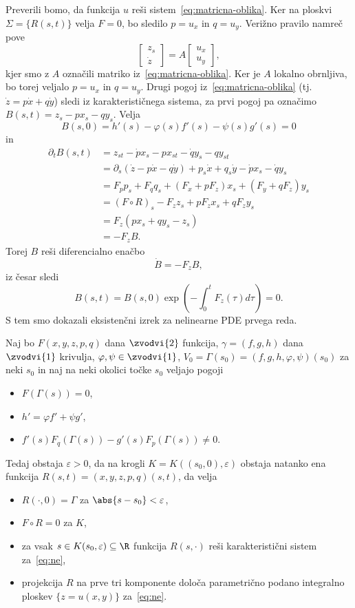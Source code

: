 Preverili bomo, da funkcija $u$ reši sistem~\eqref{eq:matricna-oblika}.
Ker na ploskvi $\Sigma = \{R(s,t)\}$ velja $F = 0$, bo sledilo $p=u_x$ in
$q=u_y$.
Verižno pravilo namreč pove
\[
  \begin{bmatrix}
	z_s \\ \dot{z}
  \end{bmatrix}
  = A
  \begin{bmatrix}
	u_x \\ u_y
  \end{bmatrix},
\]
kjer smo z $A$ označili matriko iz~\eqref{eq:matricna-oblika}.
Ker je $A$ lokalno obrnljiva, bo torej veljalo $p = u_x$ in $q = u_y$.
Drugi pogoj iz~\eqref{eq:matricna-oblika} (tj.~$\dot{z} = p \dot{x} + q
\dot{y}$) sledi iz karakterističnega sistema, za prvi pogoj pa označimo $B(s,t)
= z_s - p x_s - q y_s$.
Velja
\[
  B(s,0) = h'(s) - \varphi(s) f'(s) - \psi(s) g'(s) = 0
\]
in
\begin{align*}
  \partial_t B(s,t)
  &= z_{st} - \dot{p} x_s - p x_{st} - \dot{q} y_s - q y_{st} \\
  &= \partial_s \left( \dot{z} - p \dot{x} - q \dot{y} \right)
	+ p_s \dot{x} + q_s \dot{y} - \dot{p} x_s - \dot{q} y_s \\
  &= F_p p_s + F_q q_s + (F_x + p F_z) x_s + (F_y + q F_z) y_s \\
  &= (F \circ R)_s - F_z z_s + p F_z x_s + q F_z y_s \\
  &= F_z(p x_s + q y_s - z_s) \\
  &= - F_z B.
\end{align*}
Torej $B$ reši diferencialno enačbo
\[
  \dot{B} = - F_z B,
\]
iz česar sledi
\[
  B(s,t) = B(s,0) \exp\left( - \int_0^t F_z(\tau) d\tau \right) = 0.
\]
S tem smo dokazali eksistenčni izrek za nelinearne PDE prvega reda.

\begin{izrek}
  Naj bo $F(x,y,z,p,q)$ dana $\zvodvi{2}$ funkcija, $\gamma = (f,g,h)$ dana
  $\zvodvi{1}$ krivulja, $\varphi, \psi \in \zvodvi{1}$, $V_0 = \Gamma(s_0) =
  (f,g,h,\varphi,\psi)(s_0)$ za neki $s_0$ in naj na neki okolici točke $s_0$
  veljajo pogoji
  \begin{itemize}
  \item $F(\Gamma(s)) = 0$,
  \item $h' = \varphi f' + \psi g'$,
  \item $f'(s) F_q(\Gamma(s)) - g'(s) F_p(\Gamma(s)) \ne 0$.
  \end{itemize}
  Tedaj obstaja $\varepsilon > 0$, da na krogli $K = K((s_0, 0), \varepsilon)$
  obstaja natanko ena funkcija $R(s,t) = (x,y,z,p,q)(s,t)$, da velja
  \begin{itemize}
  \item $R(\cdot, 0) = \Gamma$ za $\abs{s-s_0} < \varepsilon$,
  \item $F\circ R = 0$ za $K$,
  \item za vsak $s \in K(s_0, \varepsilon) \subseteq \R$ funkcija $R(s, \cdot)$
	reši karakteristični sistem za~\eqref{eq:ne},
  \item projekcija $R$ na prve tri komponente določa parametrično podano
	integralno ploskev $\{z = u(x,y)\}$ za~\eqref{eq:ne}.
  \end{itemize}
\end{izrek}


